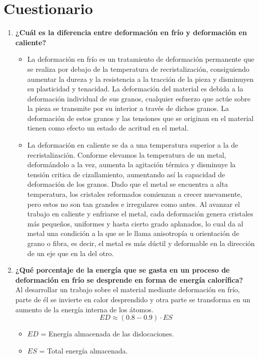 \documentclass[a4paper,12pt]{report}
\begin{document}
\section{Cuestionario}
\begin{enumerate}
\item \textbf{¿Cuál es la diferencia entre deformación en frío y deformación en caliente?}\\
\begin{itemize}
\item La deformación en frío es un tratamiento de deformación permanente que se realiza por debajo de la temperatura de recristalización, consiguiendo aumentar la dureza y la resistencia a la tracción de la pieza y disminuyen su plasticidad y tenacidad. 
La deformación del material es debida a la deformación individual de sus granos, cualquier esfuerzo que actúe sobre la pieza se transmite por su interior a través de dichos granos. La deformación de estos granos y las tensiones que se originan en el material tienen como efecto un estado de acritud en el metal.
\item La deformación en caliente se da a una temperatura superior a la de recristalización. Conforme elevamos la temperatura de un metal, deformándolo a la vez, aumenta la agitación térmica y disminuye la tensión critica de cizallamiento, aumentando así la capacidad de deformación de los granos. Dado que el metal se encuentra a alta temperatura, los cristales reformados comienzan a crecer nuevamente, pero estos no son tan grandes e irregulares como antes. Al avanzar el trabajo en caliente y enfriarse el metal, cada deformación genera cristales más pequeños, uniformes y hasta cierto grado aplanados, lo cual da al metal una condición a la que se le llama anisotropía u orientación de grano o fibra, es decir, el metal es más dúctil y deformable en la dirección de un eje que en la del otro.
\end{itemize}
\item \textbf{¿Qué porcentaje de la energía que se gasta en un proceso de deformación en frío se desprende en forma de energía calorífica?}\\
Al desarrollar un trabajo sobre el material mediante deformación en frío, parte de él se invierte en calor desprendido y otra parte se transforma en un aumento de la energía interna de los átomos.
$$
ED \approx (0.8-0.9)\cdot ES
$$
\begin{itemize}
\item $ED$ = Energía almacenada de las dislocaciones.
\item $ES$ = Total energía almacenada.

\end{itemize}
\end{enumerate}
\end{document}
